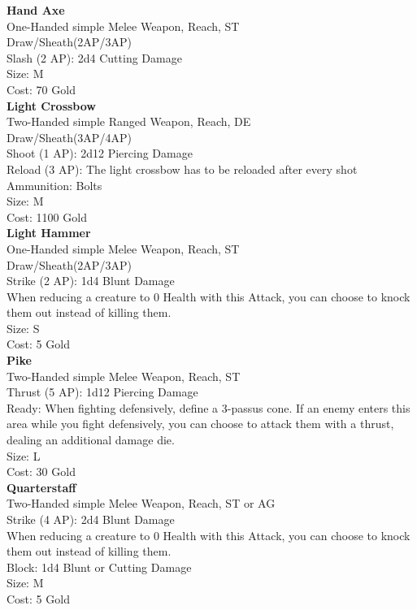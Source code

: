 \textbf{Hand Axe}\label{weapon:handAxe}\\
One-Handed simple Melee Weapon,  Reach, ST\\
Draw/Sheath(2AP/3AP)\\
Slash (2 AP): 2d4 Cutting Damage\\
Size: M\\
Cost: 70 Gold\\

\textbf{Light Crossbow}\label{weapon:lightCrossbow}\\
Two-Handed simple Ranged Weapon,  Reach, DE\\
Draw/Sheath(3AP/4AP)\\
Shoot (1 AP): 2d12 Piercing Damage\\
Reload (3 AP): The light crossbow has to be reloaded after every shot\\
Ammunition: Bolts\\
Size: M\\
Cost: 1100 Gold\\

\textbf{Light Hammer}\label{weapon:lightHammer}\\
One-Handed simple Melee Weapon,  Reach, ST\\
Draw/Sheath(2AP/3AP)\\
Strike (2 AP): 1d4 Blunt Damage\\
When reducing a creature to 0 Health with this Attack, you can choose to knock them out instead of killing them.\\
Size: S\\
Cost: 5 Gold\\

\textbf{Pike}\label{weapon:pike}\\
Two-Handed simple Melee Weapon,  Reach, ST\\
Thrust (5 AP): 1d12 Piercing Damage\\
Ready: When fighting defensively, define a 3-passus cone. If an enemy enters this area while you fight defensively, you can choose to attack them with a thrust, dealing an additional damage die.\\
Size: L\\
Cost: 30 Gold\\

\textbf{Quarterstaff}\label{weapon:quarterstaff}\\
Two-Handed simple Melee Weapon,  Reach, ST or AG\\
Strike (4 AP): 2d4 Blunt Damage\\
When reducing a creature to 0 Health with this Attack, you can choose to knock them out instead of killing them.\\
Block: 1d4 Blunt or Cutting Damage\\
Size: M\\
Cost: 5 Gold\\

